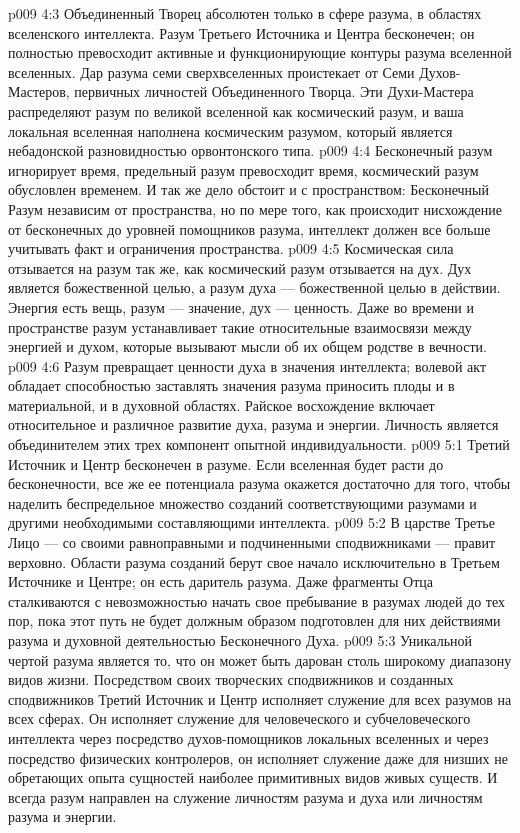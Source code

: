 \vs p009 4:3 \pc Объединенный Творец абсолютен только в сфере разума, в областях вселенского интеллекта. Разум Третьего Источника и Центра бесконечен; он полностью превосходит активные и функционирующие контуры разума вселенной вселенных. Дар разума семи сверхвселенных проистекает от Семи Духов\hyp{}Мастеров, первичных личностей Объединенного Творца. Эти Духи\hyp{}Мастера распределяют разум по великой вселенной как космический разум, и ваша локальная вселенная наполнена космическим разумом, который является небадонской разновидностью орвонтонского типа.
\vs p009 4:4 Бесконечный разум игнорирует время, предельный разум превосходит время, космический разум обусловлен временем. И так же дело обстоит и с пространством: Бесконечный Разум независим от пространства, но по мере того, как происходит нисхождение от бесконечных до уровней помощников разума, интеллект должен все больше учитывать факт и ограничения пространства.
\vs p009 4:5 \pc Космическая сила отзывается на разум так же, как космический разум отзывается на дух. Дух является божественной целью, а разум духа --- божественной целью в действии. Энергия есть вещь, разум --- значение, дух --- ценность. Даже во времени и пространстве разум устанавливает такие относительные взаимосвязи между энергией и духом, которые вызывают мысли об их общем родстве в вечности.
\vs p009 4:6 Разум превращает ценности духа в значения интеллекта; волевой акт обладает способностью заставлять значения разума приносить плоды и в материальной, и в духовной областях. Райское восхождение включает относительное и различное развитие духа, разума и энергии. Личность является объединителем этих трех компонент опытной индивидуальности.
\vs p009 5:1 Третий Источник и Центр бесконечен в разуме. Если вселенная будет расти до бесконечности, все же ее потенциала разума окажется достаточно для того, чтобы наделить беспредельное множество созданий соответствующими разумами и другими необходимыми составляющими интеллекта.
\vs p009 5:2 В царстве  Третье Лицо --- со своими равноправными и подчиненными сподвижниками --- правит верховно. Области разума созданий берут свое начало исключительно в Третьем Источнике и Центре; он есть даритель разума. Даже фрагменты Отца сталкиваются с невозможностью начать свое пребывание в разумах людей до тех пор, пока этот путь не будет должным образом подготовлен для них действиями разума и духовной деятельностью Бесконечного Духа.
\vs p009 5:3 Уникальной чертой разума является то, что он может быть дарован столь широкому диапазону видов жизни. Посредством своих творческих сподвижников и созданных сподвижников Третий Источник и Центр исполняет служение для всех разумов на всех сферах. Он исполняет служение для человеческого и субчеловеческого интеллекта через посредство духов\hyp{}помощников локальных вселенных и через посредство физических контролеров, он исполняет служение даже для низших не обретающих опыта сущностей наиболее примитивных видов живых существ. И всегда разум направлен на служение личностям разума и духа или личностям разума и энергии.
